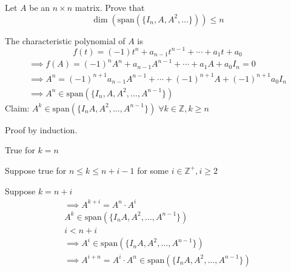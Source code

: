 Let $A$ be an $n \times n$ matrix. Prove that
\[
\dim{(\text{span}(\{I_n,A,A^2,\dots\}))}\leq n
\]

The characteristic polynomial of $A$ is 
\begin{equation}
f(t) = (-1)t^n + a_{n-1}t^{n-1} + \dotsb + a_1t + a_0
\end{equation}
\begin{gather}
\implies f(A) = (-1)^nA^n + a_{n-1}A^{n-1} + \dotsb + a_1A + a_0I_n =
0\\
\implies A^n = (-1)^{n+1}a_{n-1}A^{n-1} + \dotsb + (-1)^{n+1}A +
(-1)^{n+1}a_0I_n\\
\implies A^n \in \text{span}(\{I_n,A,A^2,\dotsc,A^{n-1}\})
\end{gather}
Claim: $A^k \in \text{span}(\{I_nA,A^2,\dotsc,A^{n-1}\}) \; \forall k
\in \mathbb{Z}, k\geq n$

Proof by induction.

True for $k=n$

Suppose true for $n\leq k \leq n+i-1$ for some $i \in \mathbb{Z}^+, i
\geq 2$

Suppose $k= n+i$
\begin{gather}
\implies A^{k+i} = A^n\cdot A^i\\
A^k \in \text{span}(\{I_nA,A^2,\dotsc,A^{n-1}\})\\
i < n + i\\
\implies A^i \in \text{span}(\{I_nA,A^2,\dotsc,A^{n-1}\})\\
\implies A^{i+n} = A^i \cdot A^n \in \text{span}(\{I_nA,A^2,\dotsc,A^{n-1}\})
\end{gather}
